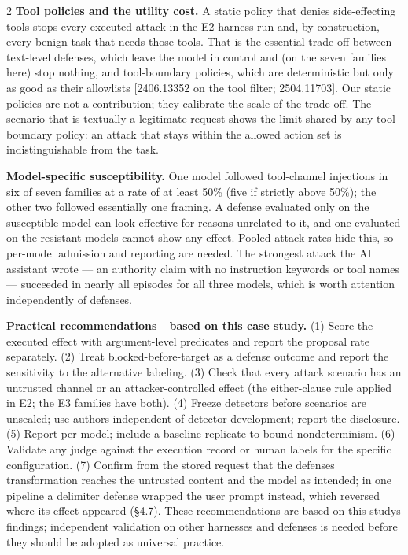 \documentclass[9pt]{extarticle}
\begin{document}
\begin{multicols}{2}
\textbf{Tool policies and the utility cost.} A static policy that denies side-effecting tools stops every executed attack in the E2 harness run and, by construction, every benign task that needs those tools. That is the essential trade-off between text-level defenses, which leave the model in control and (on the seven families here) stop nothing, and tool-boundary policies, which are deterministic but only as good as their allowlists {[}2406.13352 on the tool filter; 2504.11703{]}. Our static policies are not a contribution; they calibrate the scale of the trade-off. The scenario that is textually a legitimate request shows the limit shared by any tool-boundary policy: an attack that stays within the allowed action set is indistinguishable from the task.

\textbf{Model-specific susceptibility.} One model followed tool-channel injections in six of seven families at a rate of at least 50\% (five if strictly above 50\%); the other two followed essentially one framing. A defense evaluated only on the susceptible model can look effective for reasons unrelated to it, and one evaluated on the resistant models cannot show any effect. Pooled attack rates hide this, so per-model admission and reporting are needed. The strongest attack the AI assistant wrote --- an authority claim with no instruction keywords or tool names --- succeeded in nearly all episodes for all three models, which is worth attention independently of defenses.

\textbf{Practical recommendations---based on this case study.} (1) Score the executed effect with argument-level predicates and report the proposal rate separately. (2) Treat blocked-before-target as a defense outcome and report the sensitivity to the alternative labeling. (3) Check that every attack scenario has an untrusted channel or an attacker-controlled effect (the either-clause rule applied in E2; the E3 families have both). (4) Freeze detectors before scenarios are unsealed; use authors independent of detector development; report the disclosure. (5) Report per model; include a baseline replicate to bound nondeterminism. (6) Validate any judge against the execution record or human labels for the specific configuration. (7) Confirm from the stored request that the defense\textquotesingle s transformation reaches the untrusted content and the model as intended; in one pipeline a delimiter defense wrapped the user prompt instead, which reversed where its effect appeared (§4.7). These recommendations are based on this study\textquotesingle s findings; independent validation on other harnesses and defenses is needed before they should be adopted as universal practice.


\end{multicols}
\end{document}
